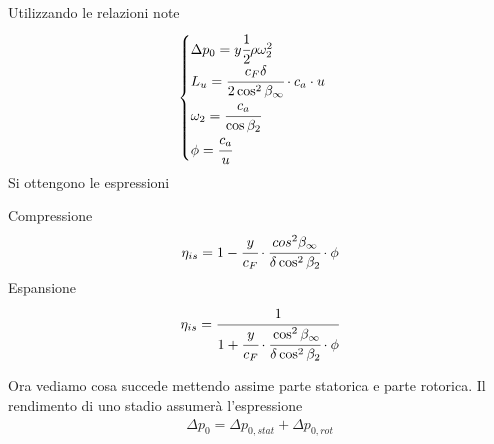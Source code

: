 Utilizzando le relazioni note
\begin{align*}
\begin{cases}
\Delta p_0 = y \cfrac{1}{2} \rho \omega_2^2\\
L_u = \cfrac{c_F \delta}{2 \cos^2 \beta_{\infty}} \cdot c_a \cdot u\\
\omega_2 = \cfrac{c_a}{\cos \beta_2}\\
\phi = \cfrac{c_a}{u}
\end{cases}
\end{align*}
Si ottengono le espressioni
\begin{multicols}{2}
Compressione
\begin{align*}
\eta_{is} = 1- \cfrac{y}{c_F} \cdot  \cfrac{cos^2 \beta_{\infty}}{\delta \cos^2 \beta_2} \cdot \phi
\end{align*}
\break
Espansione
\begin{align*}
\eta_{is} = \cfrac{1}{1+\cfrac{y}{c_F} \cdot \cfrac{\cos^2 \beta_{\infty}}{\delta \cos^2 \beta_2} \cdot \phi}
\end{align*}
\end{multicols}
Ora vediamo cosa succede mettendo assime parte statorica e parte rotorica. Il rendimento di uno stadio assumerà l'espressione
\begin{align*}
\Delta p_0 = \Delta p_{0,stat} + \Delta p_{0,rot}
\end{align*}
